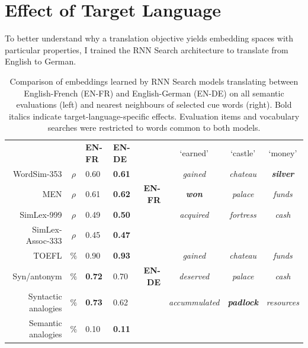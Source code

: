 \section{Effect of Target Language}
\label{lang_effects}

To better understand why a translation objective yields embedding spaces with particular properties, I trained the RNN Search architecture to translate from English to German. 

\begin{table}[ht]
\small
\begin{center}
\begin{tabular}{r c | m{0.9cm}  m{0.9cm}  r c c c }


    \multicolumn{2}{c|}{~} &\bf  \small EN-FR &\bf  \small EN-DE &  &  `earned' & `castle' & `money'\\ 
\cline{1-4} \cline{6-8}
WordSim-353   & \(\rho\) & 0.60 & \bf 0.61 &   & {\small \emph{gained}} & {\small \emph{chateau}} & {\small \bf \emph{ silver}} \\
MEN & \(\rho\) & 0.61 & \bf 0.62 \bf & \bf \small  EN-FR  & {\small \bf \emph{won}} & {\small \emph{palace}} & {\small \emph{funds}} \\
SimLex-999 & \(\rho\) & 0.49 &  \bf 0.50 &  & {\small \emph{acquired}}  & {\small \emph{fortress}}  & {\small \emph{cash}} \\
\cline{6-8}
SimLex-Assoc-333 & \(\rho\) & 0.45  & \bf 0.47   &   &  &   \\
TOEFL & \(\%\) & 0.90 & \bf 0.93  & &  {\small \emph{gained}}&  {\small \emph{chateau}} &  {\small \emph{funds}} \\ 
Syn/antonym & \(\%\) & \bf 0.72 &  0.70  &  \bf \small EN-DE   &  {\small \emph{deserved}}    &  {\small \emph{palace}}    &  {\small \emph{cash}} \\ 
Syntactic analogies & \(\%\) & \bf 0.73 & 0.62   &  &  {\small \emph{accummulated}}   &  {\small \bf \emph{ padlock}}   &  {\small \emph{resources}} \\  
Semantic analogies & \(\%\) & 0.10 & \bf  0.11  \\
\end{tabular}
\caption{Comparison of embeddings learned by RNN Search models translating between English-French (EN-FR) and English-German (EN-DE) on all semantic evaluations (left) and nearest neighbours of selected cue words (right). Bold italics indicate target-language-specific effects. Evaluation items and vocabulary searches were restricted to words common to both models. }
\label{table:de}
\end{center}
\vspace{-5mm}
\end{table}

